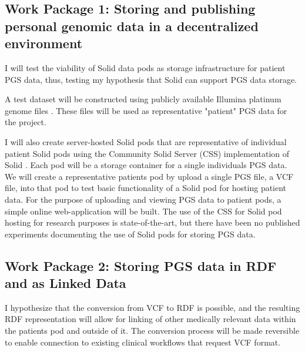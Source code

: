 \documentclass[runningheads]{llncs}
\begin{document}

\subsection{Work Package 1: Storing and publishing personal genomic data in a decentralized environment} 

I will test the viability of Solid data pods as storage infrastructure for patient PGS data, thus, testing my hypothesis that Solid can support PGS data storage. 

A test dataset will be constructed using publicly available Illumina platinum genome files \cite{noauthor_platinum_nodate}. 
These files will be used as representative "patient" PGS data for the project. 

I will also create server-hosted Solid pods that are representative of individual patient Solid pods using the Community Solid Server (CSS) implementation of Solid \cite{css}. 
Each pod will be a storage container for a single individual\textquotesingle s PGS data. 
We will create a representative patient\textquotesingle s pod by upload a single PGS file, a VCF file, into that pod to test basic functionality of a Solid pod for hosting patient data. 
For the purpose of uploading and viewing PGS data to patient pods, a simple online web-application will be built.
The use of the CSS for Solid pod hosting for research purposes is state-of-the-art, but there have been no published experiments documenting the use of Solid pods for storing PGS data. 



\subsection{Work Package 2:  Storing PGS data in RDF and as Linked Data}

I hypothesize that the conversion from VCF to RDF is possible, and the resulting RDF representation will allow for linking of other medically relevant data within the patient\textquotesingle s pod and outside of it.
The conversion process will be made reversible to enable connection to existing clinical workflows that request VCF format. 
\end{document}

